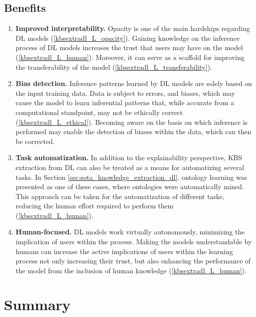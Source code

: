 \subsection{Benefits}
\begin{enumerate} [start=1,label={\bfseries B\arabic*.}]
    \item \textbf{Improved interpretability.}\label{kbsextradl_B_interpretability} Opacity is one of the main hardships regarding DL models (\ref{kbsextradl_L_opacity}). Gaining knowledge on the inference process of DL models increases the trust that users may have on the model (\ref{kbsextradl_L_human}). Moreover, it can serve as a scaffold for improving the transferability of the model (\ref{kbsextradl_L_transferability}).
    
    \item \textbf{Bias detection.}\label{kbsextradl_B_bias} Inference patterns learned by DL models are solely based on the input training data. Data is subject to errors, and biases, which may cause the model to learn inferential patterns that, while accurate from a computational standpoint, may not be ethically correct (\ref{kbsextradl_L_ethical}). Becoming aware on the basis on which inference is performed may enable the detection of biases within the data, which can then be corrected.
    
    \item \textbf{Task automatization.}\label{kbsextradl_B_automatization} In addition to the explainability perspective, KBS extraction from DL can also be treated as a means for automatizing several tasks. In Section \ref{sec:sota_knowledge_extraction_dl}, ontology learning was presented as one of these cases, where ontologies were automatically mined. This approach can be taken for the automatization of different tasks, reducing the human effort required to perform them (\ref{kbsextradl_L_human}).
    
    \item \textbf{Human-focused.}\label{kbsextradl_B_human} DL models work virtually autonomously, minimizing the implication of users within the process. Making the models understandable by humans can increase the active implications of users within the learning process not only increasing their trust, but also enhancing the performance of the model from the inclusion of human knowledge (\ref{kbsextradl_L_human}). 
\end{enumerate}

\section{Summary}